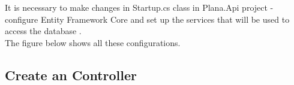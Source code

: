 \documentclass{scrartcl}
\begin{document}
It is necessary to make changes in Startup.cs class in Plana.Api project - configure Entity Framework Core and set up the services that will be used to access the database \cite{efa}.\\
The figure below shows all these configurations.

\noindent%
\begin{minipage}{\linewidth}%
\end{minipage}


\subsection{Create an Controller}

















\end{document}
